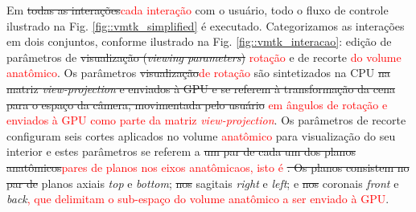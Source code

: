 \begin{figure}[ht]
 \end{figure}
 
 Em \sout{todas as interações}\textcolor{red}{cada interação} com o usuário, todo o fluxo de controle ilustrado na Fig. \ref{fig::vmtk_simplified} é executado. Categorizamos as interações em dois conjuntos, conforme ilustrado na Fig. \ref{fig::vmtk_interacao}: edição de parâmetros de \sout{visualização (\textit{viewing parameters})} \textcolor{red}{rotação} e de recorte \textcolor{red}{do volume anatômico}. Os parâmetros \sout{visualização}\textcolor{red}{de rotação} são sintetizados na CPU \sout{na matriz \textit{view-projection} e enviados à GPU  e se referem à transformação da cena para o espaço da câmera, movimentada pelo usuário} \textcolor{red}{em ângulos de rotação e enviados à GPU como parte da matriz \textit{view-projection}}. Os parâmetros de recorte configuram seis cortes aplicados no volume \textcolor{red}{anatômico} para visualização do seu interior e estes parâmetros se referem a \sout{um par de cada um dos planos anatômicos}\textcolor{red}{pares de planos nos eixos anatômicaos, isto é} \sout{. Os planos consistem no par de} planos axiais \textit{top} e \textit{bottom}; \sout{nos} sagitais \textit{right} e \textit{left}; e \sout{nos} coronais \textit{front} e \textit{back}\textcolor{red}{, que delimitam o sub-espaço do volume anatômico a ser enviado à GPU}.
 
